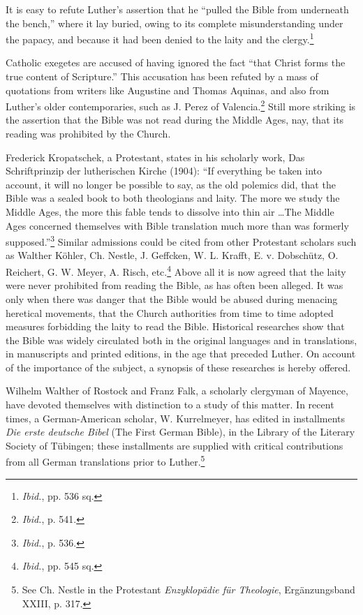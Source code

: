 It is easy to refute Luther’s assertion that he “pulled the Bible from
underneath the bench,” where it lay buried, owing to its complete
misunderstanding under the papacy, and because it had been denied
to the laity and the clergy.\footnote{\textit{Ibid.}, pp. 536 sq.}


Catholic exegetes are accused of having ignored the fact “that
Christ forms the true content of Scripture.” This accusation has been
refuted by a mass of quotations from writers like Augustine and
Thomas Aquinas, and also from Luther’s older contemporaries, such
as J. Perez of Valencia.\footnote{\textit{Ibid.}, p. 541.}
 Still more striking is the assertion that the
Bible was not read during the Middle Ages, nay, that its reading was
prohibited by the Church.

Frederick Kropatschek, a Protestant, states in his scholarly work,
Das Schriftprinzip der lutherischen Kirche (1904): “If everything
be taken into account, it will no longer be possible to say, as the old
polemics did, that the Bible was a sealed book to both theologians and
laity. The more we study the Middle Ages, the more this fable tends
to dissolve into thin air \dots The Middle Ages concerned themselves
with Bible translation much more than was formerly supposed.”\footnote{\textit{Ibid.}, p. 536.}
Similar admissions could be cited from other Protestant scholars
such as Walther Köhler, Ch. Nestle, J. Geffcken, W. L. Krafft, E.
v. Dobschütz, O. Reichert, G. W. Meyer, A. Risch, etc.\footnote{\textit{Ibid.}, pp. 545 sq.}
Above all
it is now agreed that the laity were never prohibited from reading the
Bible, as has often been alleged. It was only when there was danger
that the Bible would be abused during menacing heretical movements,
that the Church authorities from time to time adopted measures forbidding
the laity to read the Bible. Historical researches show that the
Bible was widely circulated both in the original languages and in translations,
in manuscripts and printed editions, in the age that preceded
Luther. On account of the importance of the subject, a synopsis of
these researches is hereby offered.

Wilhelm Walther of Rostock and Franz Falk, a scholarly clergyman of
Mayence, have devoted themselves with distinction to a study of this matter.
In recent times, a German-American scholar, W. Kurrelmeyer, has edited
in installments \textit{Die erste deutsche Bibel} (The First German Bible), in the
Library of the Literary Society of Tübingen; these installments are supplied
with critical contributions from all German translations prior to Luther.\footnote
{See Ch. Nestle in the Protestant \textit{Enzyklopädie für Theologie}, Ergänzungsband XXIII,
p. 317.}

